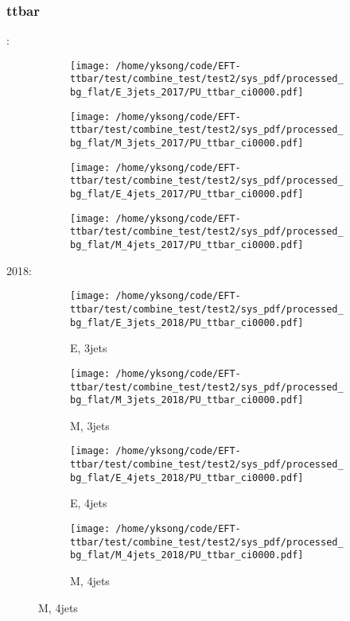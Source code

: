 \documentclass{beamer}
\begin{document}
\begin{frame}
\frametitle{ttbar}
\fontsize{5}{1}:
\begin{figure}
\centering
\begin{subfigure}[b]{0.24\textwidth}
\texttt{[image: /home/yksong/code/EFT-ttbar/test/combine\_test/test2/sys\_pdf/processed\_bg\_flat/E\_3jets\_2017/PU\_ttbar\_ci0000.pdf]}
\end{subfigure}
\begin{subfigure}[b]{0.24\textwidth}
\texttt{[image: /home/yksong/code/EFT-ttbar/test/combine\_test/test2/sys\_pdf/processed\_bg\_flat/M\_3jets\_2017/PU\_ttbar\_ci0000.pdf]}
\end{subfigure}
\begin{subfigure}[b]{0.24\textwidth}
\texttt{[image: /home/yksong/code/EFT-ttbar/test/combine\_test/test2/sys\_pdf/processed\_bg\_flat/E\_4jets\_2017/PU\_ttbar\_ci0000.pdf]}
\end{subfigure}
\begin{subfigure}[b]{0.24\textwidth}
\texttt{[image: /home/yksong/code/EFT-ttbar/test/combine\_test/test2/sys\_pdf/processed\_bg\_flat/M\_4jets\_2017/PU\_ttbar\_ci0000.pdf]}
\end{subfigure}
\end{figure}
2018:
\begin{figure}
\centering
\begin{subfigure}[b]{0.24\textwidth}
\texttt{[image: /home/yksong/code/EFT-ttbar/test/combine\_test/test2/sys\_pdf/processed\_bg\_flat/E\_3jets\_2018/PU\_ttbar\_ci0000.pdf]}
\captionsetup{font=tiny}
\caption{E, 3jets}
\end{subfigure}
\begin{subfigure}[b]{0.24\textwidth}
\texttt{[image: /home/yksong/code/EFT-ttbar/test/combine\_test/test2/sys\_pdf/processed\_bg\_flat/M\_3jets\_2018/PU\_ttbar\_ci0000.pdf]}
\captionsetup{font=tiny}
\caption{M, 3jets}
\end{subfigure}
\begin{subfigure}[b]{0.24\textwidth}
\texttt{[image: /home/yksong/code/EFT-ttbar/test/combine\_test/test2/sys\_pdf/processed\_bg\_flat/E\_4jets\_2018/PU\_ttbar\_ci0000.pdf]}
\captionsetup{font=tiny}
\caption{E, 4jets}
\end{subfigure}
\begin{subfigure}[b]{0.24\textwidth}
\texttt{[image: /home/yksong/code/EFT-ttbar/test/combine\_test/test2/sys\_pdf/processed\_bg\_flat/M\_4jets\_2018/PU\_ttbar\_ci0000.pdf]}
\captionsetup{font=tiny}
\caption{M, 4jets}
\end{subfigure}
\end{figure}
\end{frame}
\end{document}
